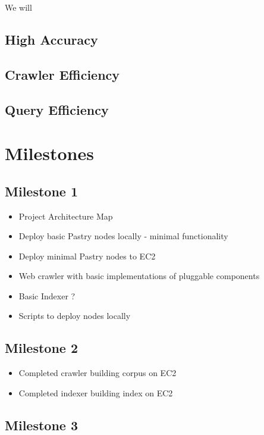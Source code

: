 \documentclass[11pt, letterpaper, oneside, twocolumn]{article}
\begin{document}
We will 

\subsection{ High Accuracy }
\subsection{ Crawler Efficiency }
\subsection{ Query Efficiency }

\section{ Milestones }

\subsection{Milestone 1}

\begin{itemize}
\item            Project Architecture Map
\item            Deploy basic Pastry nodes locally - minimal functionality
\item            Deploy minimal Pastry nodes to EC2
\item            Web crawler with basic implementations of pluggable components
\item            Basic Indexer ?
\item            Scripts to deploy nodes locally 
\end{itemize}


\subsection{Milestone 2}

\begin{itemize}
\item            Completed crawler building corpus on EC2
\item            Completed indexer building index on EC2
\end{itemize}


\subsection{Milestone 3}
\end{document}
